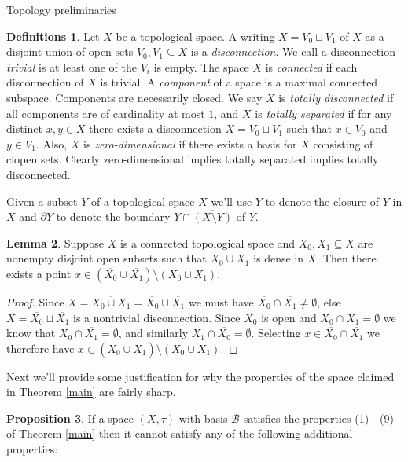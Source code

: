 \documentclass{amsart}
\theoremstyle{definition}\newtheorem{theorem}{Theorem}
\theoremstyle{definition}\newtheorem{bigtheorem}{Theorem}
\numberwithin{theorem}{section}
\theoremstyle{definition}\newtheorem{corollary}[theorem]{Corollary}
\theoremstyle{definition}\newtheorem{proposition}[theorem]{Proposition}
\theoremstyle{definition}\newtheorem{definition}[theorem]{Definition}
\theoremstyle{definition}\newtheorem{question}[theorem]{Question}
\theoremstyle{definition}\newtheorem{example}[theorem]{Example}
\theoremstyle{definition}\newtheorem{remark}[theorem]{Remark}
\theoremstyle{definition}\newtheorem{note}[theorem]{Note}
\theoremstyle{definition}\newtheorem{lemma}[theorem]{Lemma}
\theoremstyle{definition}\newtheorem{fact}[theorem]{Fact}
\theoremstyle{definition}\newtheorem{define}[theorem]{Definition}
\theoremstyle{definition}\newtheorem{definitions}[theorem]{Definitions}
\theoremstyle{definition}\newtheorem{claim}[theorem]{Claim}
\theoremstyle{definition}\newtheorem{obs}[theorem]{Observation}
\theoremstyle{definition}\newtheorem{construction}[theorem]{Construction}
\newcommand{\Bo}{\mathcal{B}}
\begin{document}
\begin{section}{Topology preliminaries}
\begin{definitions}  Let $X$ be a topological space.  A writing $X = V_0 \sqcup V_1$ of $X$ as a disjoint union of open sets $V_0, V_1 \subseteq X$ is a \emph{disconnection}.  We call a disconnection \emph{trivial} is at least one of the $V_i$ is empty.  The space $X$ is \emph{connected} if each disconnection of $X$ is trivial.  A \emph{component} of a space is a maximal connected subspace.  Components are necessarily closed.  We say $X$ is \emph{totally disconnected} if all components are of cardinality at most $1$, and $X$ is \emph{totally separated} if for any distinct $x, y\in X$ there exists a disconnection $X = V_0 \sqcup V_1$ such that $x \in V_0$ and $y \in V_1$.  Also, $X$ is \emph{zero-dimensional} if there exists a basis for $X$ consisting of clopen sets.  Clearly zero-dimensional implies totally separated implies totally disconnected.
\end{definitions}

Given a subset $Y$ of a topological space $X$ we'll use $\overline{Y}$ to denote the closure of $Y$ in $X$ and $\partial Y$ to denote the boundary $\overline{Y} \cap \overline{(X \setminus Y)}$ of $Y$.

\begin{lemma}\label{limitpoint}  Suppose $X$ is a connected topological space and $X_0, X_1 \subseteq X$ are nonempty disjoint open subsets such that $X_0 \cup X_1$ is dense in $X$.  Then there exists a point $x \in (\overline{X_0}\cup \overline{X_1}) \setminus (X_0 \cup X_1)$.
\end{lemma}

\begin{proof}  Since $X = \overline{X_0 \cup X_1} = \overline{X_0} \cup \overline{X_1}$ we must have $\overline{X_0}\cap \overline{X_1}\neq \emptyset$, else $X =  \overline{X_0} \sqcup \overline{X_1}$ is a nontrivial disconnection.  Since $X_0$ is open and $X_0 \cap X_1 = \emptyset$ we know that $X_0 \cap \overline{X_1} = \emptyset$, and similarly $X_1 \cap \overline{X_0} = \emptyset$.  Selecting $x\in \overline{X_0}\cap \overline{X_1}$ we therefore have $x\in  (\overline{X_0}\cup \overline{X_1}) \setminus (X_0 \cup X_1)$.
\end{proof}


Next we'll provide some justification for why the properties of the space claimed in Theorem \ref{main} are fairly sharp.

\begin{proposition}\label{badprop}  If a space $(X, \tau)$ with basis $\Bo$ satisfies the properties (1) - (9) of Theorem \ref{main} then it cannot satisfy any of the following additional properties:


\end{proposition}
\end{section}
\end{document}

